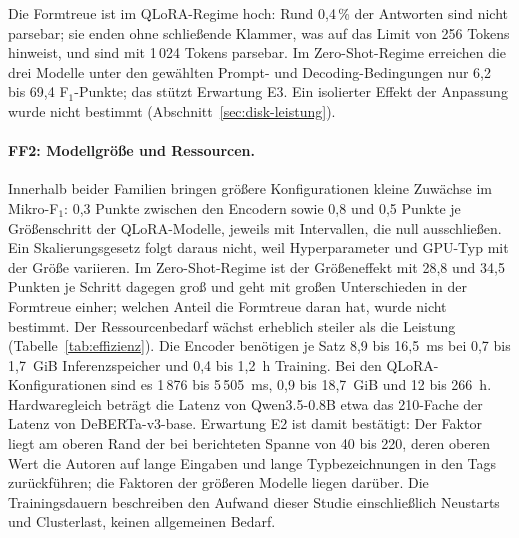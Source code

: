 Die Formtreue ist im QLoRA-Regime hoch: Rund 0,4\,\% der Antworten sind
nicht parsebar; sie enden ohne schließende Klammer, was auf das Limit von
256 Tokens hinweist, und sind mit 1\,024 Tokens parsebar.
Im Zero-Shot-Regime erreichen die drei Modelle unter den gewählten
Prompt- und Decoding-Bedingungen nur 6,2 bis 69,4 F$_1$-Punkte; das
stützt Erwartung E3.
Ein isolierter Effekt der Anpassung wurde nicht bestimmt
(Abschnitt~\ref{sec:disk-leistung}).

\paragraph{FF2: Modellgröße und Ressourcen.}
Innerhalb beider Familien bringen größere Konfigurationen kleine Zuwächse
im Mikro-F$_1$: 0,3 Punkte zwischen den Encodern sowie 0,8 und 0,5 Punkte
je Größenschritt der QLoRA-Modelle, jeweils mit Intervallen, die null
ausschließen.
Ein Skalierungsgesetz folgt daraus nicht, weil Hyperparameter und GPU-Typ
mit der Größe variieren.
Im Zero-Shot-Regime ist der Größeneffekt mit 28,8 und 34,5 Punkten je
Schritt dagegen groß und geht mit großen Unterschieden in der Formtreue
einher; welchen Anteil die Formtreue daran hat, wurde nicht
bestimmt.
Der Ressourcenbedarf wächst erheblich steiler als die Leistung
(Tabelle~\ref{tab:effizienz}).
Die Encoder benötigen je Satz 8,9 bis 16,5~ms bei 0,7 bis 1,7~GiB
Inferenzspeicher und 0,4 bis 1,2~h Training.
Bei den QLoRA-Konfigurationen sind es 1\,876 bis 5\,505~ms, 0,9 bis
18,7~GiB und 12 bis 266~h.
Hardwaregleich beträgt die Latenz von Qwen3.5-0.8B etwa das 210-Fache
der Latenz von DeBERTa-v3-base.
Erwartung E2 ist damit bestätigt: Der Faktor liegt
am oberen Rand der bei \textcite{obeidat2025llm} berichteten Spanne von
40 bis 220, deren oberen Wert die Autoren auf lange Eingaben und
lange Typbezeichnungen in den Tags zurückführen; die Faktoren der
größeren Modelle liegen darüber.
Die Trainingsdauern beschreiben den Aufwand dieser Studie einschließlich
Neustarts und Clusterlast, keinen allgemeinen Bedarf.

